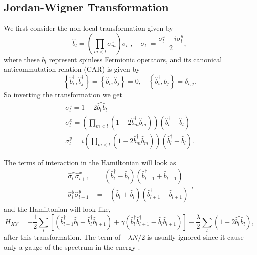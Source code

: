 \subsection{Jordan-Wigner Transformation}
We first consider the non local transformation given by
\begin{equation}
\hat{b}_{l}=\left(\prod_{m<l} \sigma_{m}^{z}\right) \sigma_{l}^{-}, \quad \sigma_{l}^{-}=\frac{\sigma_{l}^{x}-i \sigma_{l}^{y}}{2},
\end{equation}
where these $b_l$ represent spinless Fermionic operators, and its canonical anticommutation relation (CAR) is given by\cite{reyes-lega_aspects_2016} 
\begin{equation}
\left\{\hat{b}_{i}^{\dagger}, \hat{b}_{j}^{\dagger}\right\}=\left\{\hat{b}_{i}, \hat{b}_{j}\right\}=0, \quad\left\{\hat{b}_{i}^{\dagger}, \hat{b}_{j}\right\}=\delta_{i, j}.
\end{equation}
So inverting the transformation we get 
\begin{equation}
\begin{array}{l}
\sigma_{l}^{z}=1-2 \hat{b}_{l}^{\dagger} \hat{b}_{l} \\
\sigma_{l}^{x}=\left(\prod_{m<l}\left(1-2 \hat{b}_{m}^{\dagger} \hat{b}_{m}\right)\right)\left(\hat{b}_{l}^{\dagger}+\hat{b}_{l}\right) \\
\sigma_{l}^{y}=i\left(\prod_{m<l}\left(1-2 \hat{b}_{m}^{\dagger} \hat{b}_{m}\right)\right)\left(\hat{b}_{l}^{\dagger}-\hat{b}_{l}\right).
\end{array}
\end{equation}

The terms of interaction in the Hamiltonian will look as
\begin{equation}
\begin{aligned}
\hat{\sigma}_{l}^{x} \hat{\sigma}_{l+1}^{x} &=\left(\hat{b}_{l}^{\dagger}-\hat{b}_{l}\right)\left(\hat{b}_{l+1}^{\dagger}+\hat{b}_{l+1}\right) \\
\hat{\sigma}_{l}^{y} \hat{\sigma}_{l+1}^{y} &=-\left(\hat{b}_{l}^{\dagger}+\hat{b}_{l}\right)\left(\hat{b}_{l+1}^{\dagger}-\hat{b}_{l+1}\right)
\end{aligned},
\end{equation}
and the Hamiltonian will look like,
\begin{equation}
H_{X Y}=-\frac{1}{2} \sum_{l}\left[\left(\hat{b}_{l+1}^{\dagger} \hat{b}_{l}+\hat{b}_{l}^{\dagger} \hat{b}_{l+1}\right)+\gamma\left(\hat{b}_{l}^{\dagger} \hat{b}_{l+1}^{\dagger}-\hat{b}_{l} \hat{b}_{l+1}\right)\right]-\frac{\lambda}{2} \sum_{l}\left(1-2 \hat{b}_{l}^{\dagger} \hat{b}_{l}\right),
\end{equation}
after this transformation. The term of $-\lambda N/2$ is usually ignored since it cause only a gauge of the spectrum in the energy\cite{reyes-lega_aspects_2016} .
